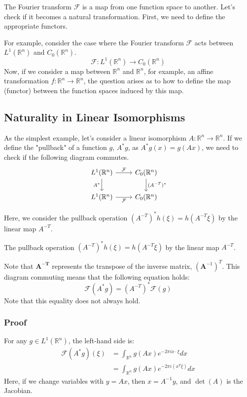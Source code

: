 \documentclass[uplatex,a4j,12pt,dvipdfmx]{jsarticle}
\begin{document}
The Fourier transform $\mathcal{F}$ is a map from one function space to another.
Let's check if it becomes a natural transformation.
First, we need to define the appropriate functors.

For example, consider the case where the Fourier transform $\mathcal{F}$ acts between $L^1(\mathbb{R}^n)$ and $C_0(\mathbb{R}^n)$.
\[
	\mathcal{F}: L^1(\mathbb{R}^n) \to C_0(\mathbb{R}^n)
\]
Now, if we consider a map between $\mathbb{R}^n$ and $\mathbb{R}^n$, for example, an affine transformation $f: \mathbb{R}^n \to \mathbb{R}^n$, the question arises as to how to define the map (functor) between the function spaces induced by this map.

\subsection{Naturality in Linear Isomorphisms}

As the simplest example, let's consider a linear isomorphism $A: \mathbb{R}^n \to \mathbb{R}^n$.
If we define the "pullback" of a function $g$, $A^*g$, as $A^*g(x) = g(Ax)$, we need to check if the following diagram commutes.
\[
	\begin{tikzcd}
		L^1(\mathbb{R}^n) \arrow[r, "\mathcal{F}"] \arrow[d, "A^*"'] & C_0(\mathbb{R}^n) \arrow[d, "(A^{-T})^*"] \\
		L^1(\mathbb{R}^n) \arrow[r, "\mathcal{F}"'] & C_0(\mathbb{R}^n)
	\end{tikzcd}
\]

Here, we consider the pullback operation $(A^{-T})^*h(\xi) = h(A^{-T}\xi)$ by the linear map $A^{-T}$.

The pullback operation $(A^{-T})^*h(\xi) = h(A^{-T}\xi)$ by the linear map $A^{-T}$.

Note that $\boldsymbol{A^{-T}}$ represents the transpose of the inverse matrix, $(\boldsymbol{A}^{-1})^{T}$.
This diagram commuting means that the following equation holds:
\[
	\mathcal{F}(A^*g) = (A^{-T})^*\mathcal{F}(g)
\]
Note that this equality does not always hold.

\subsubsection{Proof}

For any $g \in L^1(\mathbb{R}^n)$, the left-hand side is:
\begin{align*}
	\mathcal{F}(A^* g)(\xi) & = \int_{\mathbb{R}^n} g(Ax) e^{-2\pi i x \cdot \xi} dx \\
	                        & = \int_{\mathbb{R}^n} g(Ax) e^{-2\pi i (x^T \xi)} dx
\end{align*}
Here, if we change variables with $y = Ax$, then $x = A^{-1}y$, and $\det(A)$ is the Jacobian.
\end{document}
